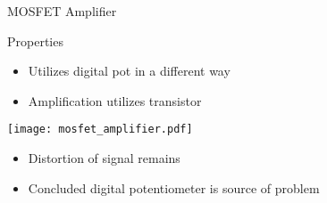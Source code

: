 \begin{frame}{MOSFET Amplifier}
  \begin{block}{Properties}
  \begin{itemize}
    \item Utilizes digital pot in a different way
    \item Amplification utilizes transistor
  \end{itemize}
  \end{block}

  \begin{multicols}{2}

  \begin{center}
  \texttt{[image: mosfet\_amplifier.pdf]}
  \end{center}

  \newpage

    \begin{itemize}
      \item Distortion of signal remains
      \item Concluded digital potentiometer is source of problem
    \end{itemize}    

  \end{multicols}
\end{frame}


